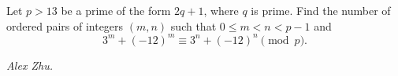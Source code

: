 Let $p>13$ be a prime of the form $2q+1$, where $q$ is prime. Find the number of ordered pairs of integers $(m,n)$ such that $0\le m<n<p-1$ and
\[3^m+(-12)^m\equiv 3^n+(-12)^n\pmod{p}.\]

\textit{Alex Zhu.}

